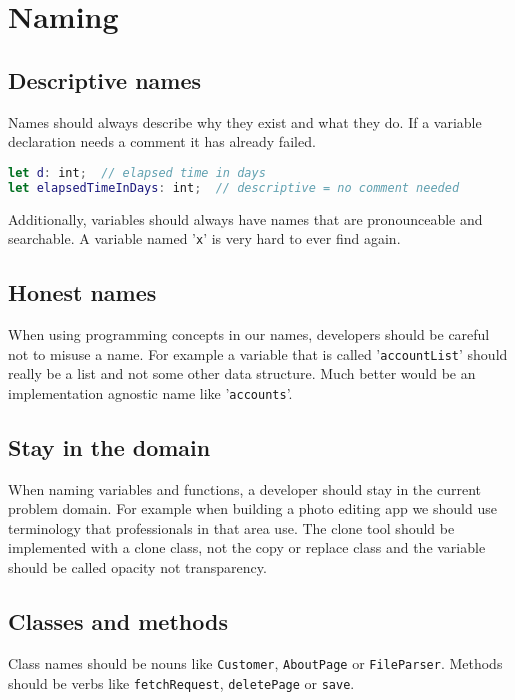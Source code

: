 \section{Naming}

\subsection{Descriptive names}
Names should always describe why they exist and what they do. If a variable declaration needs a comment it has already failed.

\begin{lstlisting}[language=Swift]
let d: int;  // elapsed time in days
let elapsedTimeInDays: int;  // descriptive = no comment needed
\end{lstlisting}
\raggedright

Additionally, variables should always have names that are pronounceable and searchable. A variable named '\texttt{x}' is very hard to ever find again.

\subsection{Honest names}
When using programming concepts in our names, developers should be careful not to misuse a name. For example a variable that is called '\texttt{accountList}' should really be a list and not some other data structure. Much better would be an implementation agnostic name like '\texttt{accounts}'.

\subsection{Stay in the domain}
When naming variables and functions, a developer should stay in the current problem domain. For example when building a photo editing app we should use terminology that professionals in that area use. The clone tool should be implemented with a clone class, not the copy or replace class and the variable should be called opacity not transparency.

\subsection{Classes and methods}
Class names should be nouns like \texttt{Customer}, \texttt{AboutPage} or \texttt{FileParser}. Methods should be verbs like \texttt{fetchRequest}, \texttt{deletePage} or \texttt{save}.

